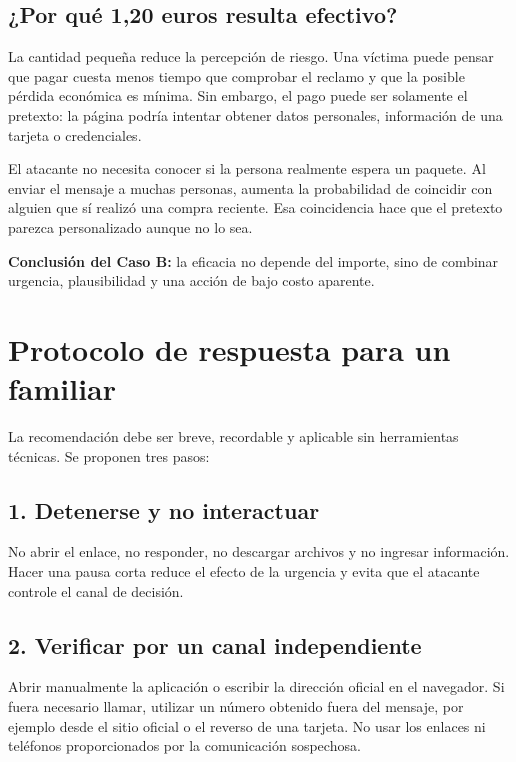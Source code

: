 \documentclass[11pt,a4paper]{article}
\newcommand{\infobox}[1]{%
  \noindent\colorbox{fondo}{\parbox{\dimexpr\textwidth-2\fboxsep}{#1}}}
\newcommand{\reportpage}{\clearpage\thispagestyle{fancy}}
\begin{document}
\subsection*{¿Por qué 1,20 euros resulta efectivo?}

La cantidad pequeña reduce la percepción de riesgo. Una víctima puede pensar que pagar cuesta menos tiempo que comprobar el reclamo y que la posible pérdida económica es mínima. Sin embargo, el pago puede ser solamente el pretexto: la página podría intentar obtener datos personales, información de una tarjeta o credenciales.

El atacante no necesita conocer si la persona realmente espera un paquete. Al enviar el mensaje a muchas personas, aumenta la probabilidad de coincidir con alguien que sí realizó una compra reciente. Esa coincidencia hace que el pretexto parezca personalizado aunque no lo sea.

\infobox{\textcolor{alerta}{\textbf{Conclusión del Caso B:}} la eficacia no depende del importe, sino de combinar urgencia, plausibilidad y una acción de bajo costo aparente.}

\reportpage
\section*{Protocolo de respuesta para un familiar}

La recomendación debe ser breve, recordable y aplicable sin herramientas técnicas. Se proponen tres pasos:

\subsection*{1. Detenerse y no interactuar}

No abrir el enlace, no responder, no descargar archivos y no ingresar información. Hacer una pausa corta reduce el efecto de la urgencia y evita que el atacante controle el canal de decisión.

\subsection*{2. Verificar por un canal independiente}

Abrir manualmente la aplicación o escribir la dirección oficial en el navegador. Si fuera necesario llamar, utilizar un número obtenido fuera del mensaje, por ejemplo desde el sitio oficial o el reverso de una tarjeta. No usar los enlaces ni teléfonos proporcionados por la comunicación sospechosa.
\end{document}
